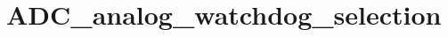\hypertarget{group___a_d_c__analog__watchdog__selection}{\section{A\-D\-C\-\_\-analog\-\_\-watchdog\-\_\-selection}
\label{group___a_d_c__analog__watchdog__selection}
}
